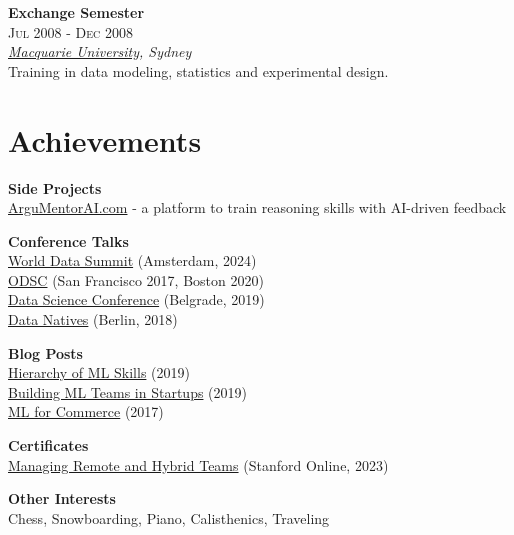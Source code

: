 \documentclass[a4paper,9.5pt]{article}
\begin{document}
\begin{minipage}[t]{0.32\textwidth}
\textbf{Exchange Semester}\\
\textsc{Jul 2008 - Dec 2008}\\
\textit{\href{https://www.mq.edu.au/}{Macquarie University}, Sydney}\\
Training in data modeling, statistics and experimental design.
\vspace{4mm}

\section{Achievements}
\small
\vspace{1.5mm}
\textbf{Side Projects}\\
\href{https://argumentorai.com}{ArguMentorAI.com} - a platform to train reasoning skills with AI-driven feedback
\vspace{2mm}

\textbf{Conference Talks}\\
\href{https://worlddatasummit.com/}{World Data Summit} (Amsterdam, 2024)\\
\href{https://odsc.com}{ODSC} (San Francisco 2017, Boston 2020)\\
\href{https://www.datasciconference.com/}{Data Science Conference} (Belgrade, 2019)\\
\href{https://datanatives.io}{Data Natives} (Berlin, 2018)
\vspace{2mm}

\textbf{Blog Posts}\\
\href{https://medium.com/data-science/what-separates-good-from-great-data-scientists-2906431455fd}{Hierarchy of ML Skills} (2019)\\
\href{https://techblog.commercetools.com/building-up-a-data-science-team-from-scratch-7a7b24ba9f2d}{Building ML Teams in Startups} (2019)\\
\href{https://techblog.commercetools.com/top-5-machine-learning-applications-for-e-commerce-268eb1c89607}{ML for Commerce} (2017)
\vspace{2mm}

\textbf{Certificates}\\
\href{https://digitalcredential.stanford.edu/check/39630025A12C2EB7C4949C5B5DB1DDC7D0DFF92B2D09C7D43679B83124771827QmZ2c3BqZEhvVFBUV29FOGRRWE11Uy9YWm91TjkydDFuRjVWY0ZPU1JjZnBhMHJI}{Managing Remote and Hybrid Teams} (Stanford Online, 2023)
\vspace{2mm}

\textbf{Other Interests}\\
Chess, Snowboarding, Piano, Calisthenics, Traveling

\end{minipage}
\end{document}
